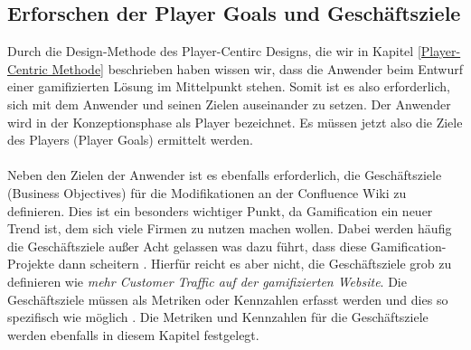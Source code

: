 \documentclass[a4paper,12pt,twoside]{scrartcl}
\begin{document}
\subsection{Erforschen der Player Goals und Geschäftsziele}
Durch die Design-Methode des Player-Centirc Designs, die wir in Kapitel \ref{Player-Centric Methode} beschrieben haben wissen wir, dass die Anwender beim Entwurf einer gamifizierten Lösung im Mittelpunkt stehen. Somit ist es also erforderlich, sich mit dem Anwender und seinen Zielen auseinander zu setzen. Der Anwender wird in der  Konzeptionsphase als Player bezeichnet. Es müssen jetzt also die Ziele des Players (Player Goals) ermittelt werden. 
\\\\
Neben den Zielen der Anwender ist es ebenfalls erforderlich, die Geschäftsziele (Business Objectives) für die Modifikationen an der Confluence Wiki zu definieren. Dies ist ein besonders wichtiger Punkt, da Gamification ein neuer Trend ist, dem sich viele Firmen zu nutzen machen wollen. Dabei werden häufig die Geschäftsziele außer Acht gelassen was dazu führt, dass diese Gamification-Projekte dann scheitern \cite{gamificationDefinition}. Hierfür reicht es aber nicht, die Geschäftsziele grob zu definieren wie \textit{mehr Customer Traffic auf der gamifizierten Website}. Die Geschäftsziele müssen als Metriken oder Kennzahlen erfasst werden und dies so spezifisch wie möglich \cite{gamificationDefinition}. Die Metriken und Kennzahlen für die Geschäftsziele werden ebenfalls in diesem Kapitel festgelegt.
\end{document}
